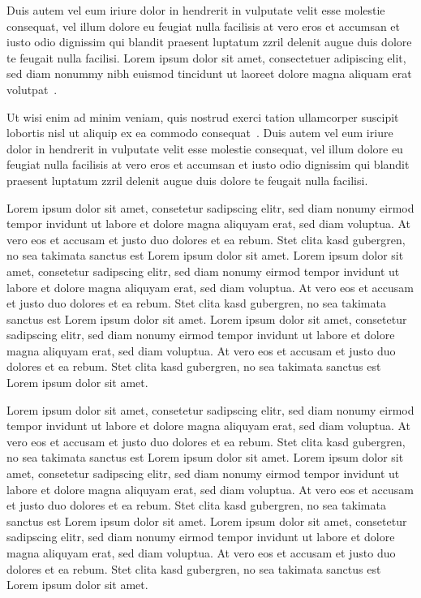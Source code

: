 \documentclass[journal]{vgtc}
\begin{document}
Duis autem vel eum iriure dolor in hendrerit in vulputate velit esse
molestie consequat, vel illum dolore eu feugiat nulla facilisis at
vero eros et accumsan et iusto odio dignissim qui blandit praesent
luptatum zzril delenit augue duis dolore te feugait nulla
facilisi. Lorem ipsum dolor sit amet, consectetuer adipiscing elit,
sed diam nonummy nibh euismod tincidunt ut laoreet dolore magna
aliquam erat volutpat~\cite{kindlmann:1999:SAG}.

Ut wisi enim ad minim veniam, quis nostrud exerci tation ullamcorper
suscipit lobortis nisl ut aliquip ex ea commodo
consequat~\cite{levoy:1989:DSV}. Duis autem vel eum iriure dolor in
hendrerit in vulputate velit esse molestie consequat, vel illum dolore
eu feugiat nulla facilisis at vero eros et accumsan et iusto odio
dignissim qui blandit praesent luptatum zzril delenit augue duis
dolore te feugait nulla facilisi.

Lorem ipsum dolor sit amet, consetetur sadipscing elitr, sed diam
nonumy eirmod tempor invidunt ut labore et dolore magna aliquyam erat,
sed diam voluptua. At vero eos et accusam et justo duo dolores et ea
rebum. Stet clita kasd gubergren, no sea takimata sanctus est Lorem
ipsum dolor sit amet. Lorem ipsum dolor sit amet, consetetur
sadipscing elitr, sed diam nonumy eirmod tempor invidunt ut labore et
dolore magna aliquyam erat, sed diam voluptua. At vero eos et accusam
et justo duo dolores et ea rebum. Stet clita kasd gubergren, no sea
takimata sanctus est Lorem ipsum dolor sit amet. Lorem ipsum dolor sit
amet, consetetur sadipscing elitr, sed diam nonumy eirmod tempor
invidunt ut labore et dolore magna aliquyam erat, sed diam
voluptua. At vero eos et accusam et justo duo dolores et ea
rebum. Stet clita kasd gubergren, no sea takimata sanctus est Lorem
ipsum dolor sit amet.

Lorem ipsum dolor sit amet, consetetur sadipscing elitr, sed diam
nonumy eirmod tempor invidunt ut labore et dolore magna aliquyam erat,
sed diam voluptua. At vero eos et accusam et justo duo dolores et ea
rebum. Stet clita kasd gubergren, no sea takimata sanctus est Lorem
ipsum dolor sit amet. Lorem ipsum dolor sit amet, consetetur
sadipscing elitr, sed diam nonumy eirmod tempor invidunt ut labore et
dolore magna aliquyam erat, sed diam voluptua. At vero eos et accusam
et justo duo dolores et ea rebum. Stet clita kasd gubergren, no sea
takimata sanctus est Lorem ipsum dolor sit amet. Lorem ipsum dolor sit
amet, consetetur sadipscing elitr, sed diam nonumy eirmod tempor
invidunt ut labore et dolore magna aliquyam erat, sed diam
voluptua. At vero eos et accusam et justo duo dolores et ea
rebum. Stet clita kasd gubergren, no sea takimata sanctus est Lorem
ipsum dolor sit amet.
\end{document}
